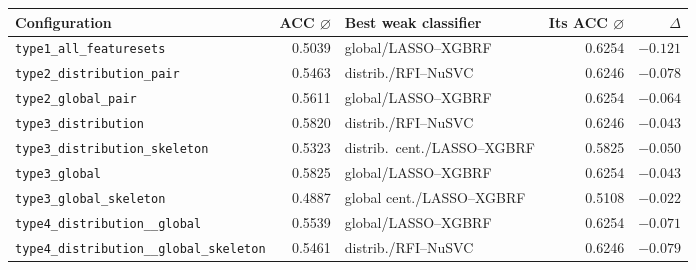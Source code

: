 {\scriptsize\setlength{\tabcolsep}{3pt}%
\begin{tabular}{>{\raggedright\arraybackslash}p{}r>{\raggedright\arraybackslash}p{}rr}
\toprule
Configuration & ACC $\varnothing$ & Best weak classifier & Its ACC $\varnothing$ & $\Delta$ \\
\midrule
\texttt{type1\_\allowbreak all\_\allowbreak featuresets}                                                               & 0.5039 & global/LASSO--XGBRF          & 0.6254 & $-0.121$ \\
\midrule
\texttt{type2\_\allowbreak distribution\_\allowbreak pair}                                                             & 0.5463 & distrib./RFI--NuSVC          & 0.6246 & $-0.078$ \\
\texttt{type2\_\allowbreak global\_\allowbreak pair}                                                                   & 0.5611 & global/LASSO--XGBRF          & 0.6254 & $-0.064$ \\
\midrule
\texttt{type3\_\allowbreak distribution}                                                                               & 0.5820 & distrib./RFI--NuSVC          & 0.6246 & $-0.043$ \\
\texttt{type3\_\allowbreak distribution\_\allowbreak skeleton}                                                         & 0.5323 & distrib.\ cent./LASSO--XGBRF & 0.5825 & $-0.050$ \\
\texttt{type3\_\allowbreak global}                                                                                     & 0.5825 & global/LASSO--XGBRF          & 0.6254 & $-0.043$ \\
\texttt{type3\_\allowbreak global\_\allowbreak skeleton}                                                               & 0.4887 & global cent./LASSO--XGBRF    & 0.5108 & $-0.022$ \\
\midrule
\texttt{type4\_\allowbreak distribution\_\allowbreak \_\allowbreak global}                                             & 0.5539 & global/LASSO--XGBRF          & 0.6254 & $-0.071$ \\
\texttt{type4\_\allowbreak distribution\_\allowbreak \_\allowbreak global\_\allowbreak skeleton}                       & 0.5461 & distrib./RFI--NuSVC          & 0.6246 & $-0.079$ \\

\end{tabular}}
